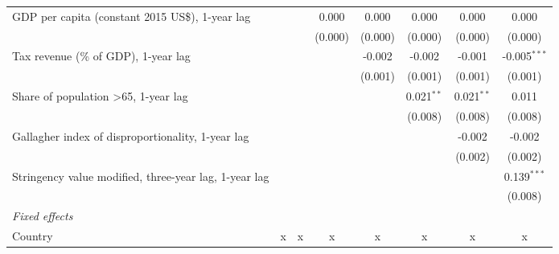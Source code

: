 \begin{tabular}{lccccccc}
   GDP per capita (constant 2015 US\$), 1-year lag                                        &              &               & 0.000         & 0.000         & 0.000        & 0.000        & 0.000\\   
                                                                                          &              &               & (0.000)       & (0.000)       & (0.000)      & (0.000)      & (0.000)\\   
   Tax revenue (\% of GDP), 1-year lag                                                    &              &               &               & -0.002        & -0.002       & -0.001       & -0.005$^{***}$\\   
                                                                                          &              &               &               & (0.001)       & (0.001)      & (0.001)      & (0.001)\\   
   Share of population >65, 1-year lag                                                    &              &               &               &               & 0.021$^{**}$ & 0.021$^{**}$ & 0.011\\   
                                                                                          &              &               &               &               & (0.008)      & (0.008)      & (0.008)\\   
   Gallagher index of disproportionality, 1-year lag                                      &              &               &               &               &              & -0.002       & -0.002\\   
                                                                                          &              &               &               &               &              & (0.002)      & (0.002)\\   
   Stringency value modified, three-year lag, 1-year lag                                  &              &               &               &               &              &              & 0.139$^{***}$\\   
                                                                                          &              &               &               &               &              &              & (0.008)\\   
   \emph{Fixed effects}\\
   Country                                                                                & x            & x             & x             & x             & x            & x            & x\\  

\end{tabular}
